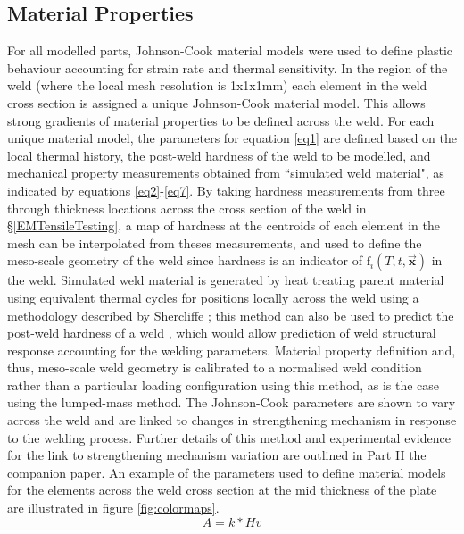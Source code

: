 \subsection{Material Properties}
\label{FEMaterialProperties}
For all modelled parts, Johnson-Cook material models were used to define plastic behaviour accounting for strain rate and thermal sensitivity. In the region of the weld (where the local mesh resolution is 1x1x1mm) each element in the weld cross section is assigned a unique Johnson-Cook material model. This allows strong gradients of material properties to be defined across the weld. For each unique material model, the parameters for equation \ref{eq1} are defined based on the local thermal history, the post-weld hardness of the weld to be modelled, and mechanical property measurements obtained from ``simulated weld material", as indicated by equations \ref{eq2}-\ref{eq7}. By taking hardness measurements from three through thickness locations across the cross section of the weld in \S\ref{EMTensileTesting}, a map of hardness at the centroids of each element in the mesh can be interpolated from theses measurements, and used to define the meso-scale geometry of the weld since hardness is an indicator of $\textrm{f}_i(T,t,\vec{\textbf{x}})$ in the weld. Simulated weld material is generated by heat treating parent material using equivalent thermal cycles for positions locally across the weld using a methodology described by Shercliffe \cite{Shercliff1990,Shercliff1990a}; this method can also be used to predict the post-weld hardness of a weld \cite{Robson2006a,Sullivan2011}, which would allow prediction of weld structural response accounting for the welding parameters. Material property definition and, thus, meso-scale weld geometry is calibrated to a normalised weld condition rather than a particular loading configuration using this method, as is the case using the lumped-mass method. The Johnson-Cook parameters are shown to vary across the weld and are linked to changes in strengthening mechanism in response to the welding process. Further details of this method and experimental evidence for the link to strengthening mechanism variation are outlined in Part II the companion paper. An example of the parameters used to define material models for the elements across the weld cross section at the mid thickness of the plate are illustrated in figure \ref{fig:colormaps}.
\begin{equation}
\label{eq2}
A=k*Hv %
\end{equation}
